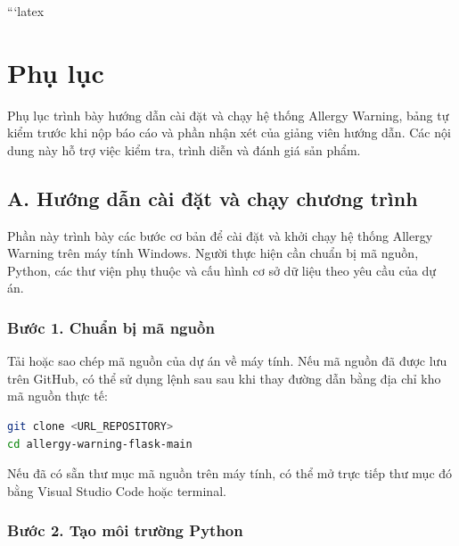 ```latex

\chapter{Phụ lục}
\label{ch:phuluc}

Phụ lục trình bày hướng dẫn cài đặt và chạy hệ thống Allergy Warning,
bảng tự kiểm trước khi nộp báo cáo và phần nhận xét của giảng viên
hướng dẫn. Các nội dung này hỗ trợ việc kiểm tra, trình diễn và
đánh giá sản phẩm.


\section*{A. Hướng dẫn cài đặt và chạy chương trình}
{}

Phần này trình bày các bước cơ bản để cài đặt và khởi chạy hệ thống
Allergy Warning trên máy tính Windows. Người thực hiện cần chuẩn bị
mã nguồn, Python, các thư viện phụ thuộc và cấu hình cơ sở dữ liệu
theo yêu cầu của dự án.

\subsection*{Bước 1. Chuẩn bị mã nguồn}

Tải hoặc sao chép mã nguồn của dự án về máy tính. Nếu mã nguồn đã
được lưu trên GitHub, có thể sử dụng lệnh sau sau khi thay đường dẫn
bằng địa chỉ kho mã nguồn thực tế:

\begin{lstlisting}[language=bash, caption={Tải mã nguồn dự án}]
git clone <URL_REPOSITORY>
cd allergy-warning-flask-main
\end{lstlisting}

Nếu đã có sẵn thư mục mã nguồn trên máy tính, có thể mở trực tiếp
thư mục đó bằng Visual Studio Code hoặc terminal.

\subsection*{Bước 2. Tạo môi trường Python}

